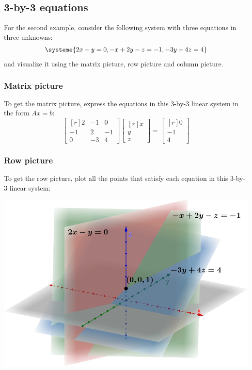 \documentclass[../main.tex]{subfiles}
\begin{document}
\subsection{3-by-3 equations}
For the second example, consider the following system with three equations in three unknowns:
\[
    \systeme{2x - y = 0, -x + 2y - z = -1, -3y + 4z = 4}
\]
and visualize it using the matrix picture, row picture and column picture.

\subsubsection{Matrix picture}
To get the matrix picture, express the equations in this 3-by-3 linear system in the form \(Ax = b\):
\[
    \begin{bmatrix*}[r]
        2 & -1 & 0 \\
        -1 & 2 & -1 \\
        0 & -3 & 4
    \end{bmatrix*}
    \begin{bmatrix*}[r]
        x \\
        y \\
        z
    \end{bmatrix*}
    =
    \begin{bmatrix*}[r]
        0 \\
        -1 \\
        4
    \end{bmatrix*}
\]

\subsubsection{Row picture}
To get the row picture, plot all the points that satisfy each equation in this 3-by-3 linear system:

\begingroup
\centering
\includegraphics[width = 0.9\columnwidth]{../figures/fig03_3d-row-pic/geogebra-derived}
\par
\endgroup
\end{document}
